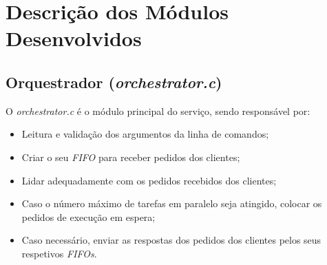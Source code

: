 \documentclass[a4paper,11pt]{scrreprt}
\begin{document}
    \section{Descrição dos Módulos Desenvolvidos}
        \subsection{Orquestrador (\textit{orchestrator.c})}
            O \textit{orchestrator.c} é o módulo principal do serviço, sendo responsável por:
            \begin{itemize}
                \item Leitura e validação dos argumentos da linha de comandos;
                \item Criar o seu \textit{FIFO} para receber pedidos dos clientes;
                \item Lidar adequadamente com os pedidos recebidos dos clientes;
                \item Caso o número máximo de tarefas em paralelo seja atingido,
                    colocar os pedidos de execução em espera;
                \item Caso necessário, enviar as respostas dos pedidos dos clientes pelos seus respetivos \textit{FIFOs}.
            \end{itemize}
\end{document}
